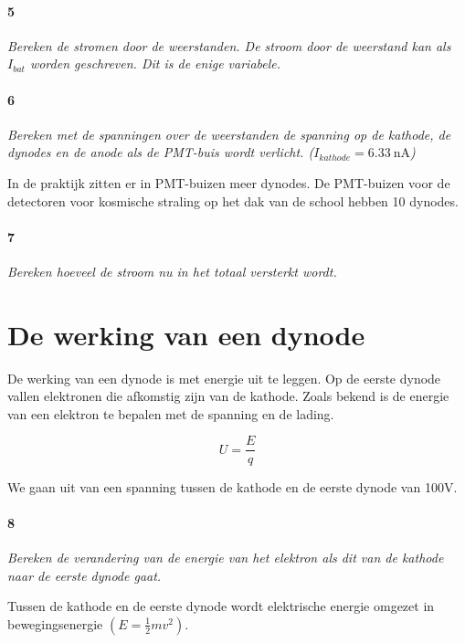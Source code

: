 \paragraph{5}

\textit{Bereken de stromen door de weerstanden. De stroom door de weerstand 
kan als $I_{bat}$ worden geschreven. Dit is de enige variabele.}

\paragraph{6}

\textit{Bereken met de spanningen over de weerstanden de spanning op de
kathode, de dynodes en de anode als de PMT-buis wordt verlicht.
($I_{kathode} = \SI{6.33}{\nano\ampere}$)}

In de praktijk zitten er in PMT-buizen meer dynodes. De PMT-buizen
voor de detectoren voor kosmische straling op het dak van de school
hebben 10 dynodes.


\paragraph{7}

\textit{Bereken hoeveel de stroom nu in het totaal versterkt wordt.}


\section{De werking van een dynode}

De werking van een dynode is met energie uit te leggen. Op de eerste
dynode vallen elektronen die afkomstig zijn van de kathode. Zoals
bekend is de energie van een elektron te bepalen met de spanning en
de lading.

\begin{equation}
    U = \frac{E}{q}
\end{equation}


We gaan uit van een spanning tussen de kathode en de eerste dynode van 100V.


\paragraph{8}

\textit{Bereken de verandering van de energie van het elektron als dit
van de kathode naar de eerste dynode gaat.}

Tussen de kathode en de eerste dynode wordt elektrische energie omgezet
in bewegingsenergie $\left(E=\frac{1}{2}mv^{2}\right)$.


